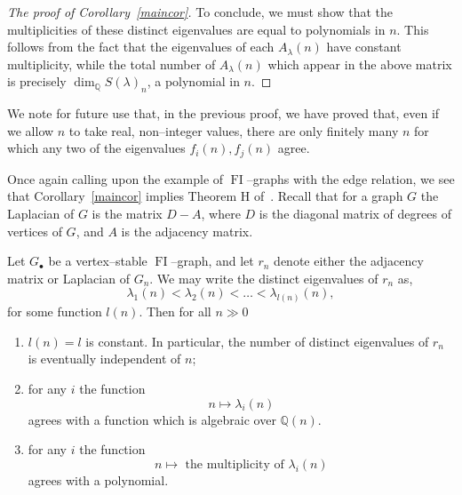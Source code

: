 \documentclass[ALCO,ThmDefs,Unicode,epreuves]{cedram}
\DeclareMathOperator{\FI}{FI}
\newcommand{\Q}{\mathbb{Q}}
\newcommand{\dt}{\bullet}
\begin{document}
\begin{proof}[The proof of Corollary~\ref{maincor}]
To conclude, we must show that the multiplicities of these distinct eigenvalues are equal to polynomials in $n$. This follows from the fact that the eigenvalues of each $A_{\lambda}(n)$ have constant multiplicity, while the total number of $A_{\lambda}(n)$ which appear in the above matrix is precisely $\dim_\Q S(\lambda)_n$, a polynomial in $n$.
\end{proof}

\begin{remark}\label{canorder}
We note for future use that, in the previous proof, we have proved that, even if we allow $n$ to take real, non--integer values, there are only finitely many $n$ for which any two of the eigenvalues $f_i(n), f_j(n)$ agree.
\end{remark}


Once again calling upon the example of $\FI$--graphs with the edge relation, we see that Corollary~\ref{maincor} implies Theorem H of~\cite{RW}. Recall that for a graph $G$ the Laplacian of $G$ is the matrix $D-A$, where $D$ is the diagonal matrix of degrees of vertices of $G$, and $A$ is the adjacency matrix.

\begin{theorem}\label{rwthm}
Let $G_\dt$ be a vertex--stable $\FI$--graph, and let $r_n$ denote either the adjacency matrix or Laplacian of $G_n$. We may write the distinct eigenvalues of $r_n$ as,
\[
\lambda_1(n) < \lambda_2(n) < \dots< \lambda_{l(n)}(n),
\]
for some function $l(n)$. Then for all $n \gg 0$
\begin{enumerate}
\item\label{theo4.14_1} $l(n) = l$ is constant. In particular, the number of distinct eigenvalues of $r_n$ is eventually independent of $n$;
\item\label{theo4.14_2} for any $i$ the function
\[
n \mapsto \lambda_i(n)
\]
agrees with a function which is algebraic over $\Q(n)$.
\item\label{theo4.14_3} for any $i$ the function
\[
n \mapsto \text{ the multiplicity of $\lambda_i(n)$}
\]
agrees with a polynomial.
\end{enumerate}
\end{theorem}
\end{document}
